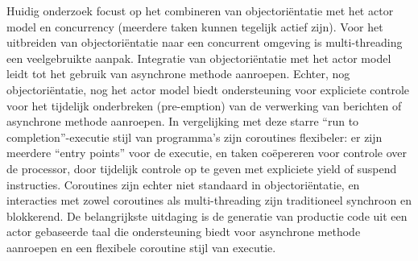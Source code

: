 Huidig onderzoek focust op het combineren van objectori\"{e}ntatie met het actor model en concurrency (meerdere taken kunnen tegelijk actief zijn).
Voor het uitbreiden van objectori\"{e}ntatie naar een concurrent omgeving is multi-threading een veelgebruikte aanpak.
Integratie van objectori\"{e}ntatie met het actor model leidt tot het gebruik van asynchrone methode aanroepen.
Echter, nog objectori\"{e}ntatie, nog het actor model biedt ondersteuning voor expliciete controle voor het tijdelijk onderbreken (pre-emption) van de verwerking van berichten of asynchrone methode aanroepen.
In vergelijking met deze starre ``run to completion''-executie stijl van programma's zijn coroutines flexibeler: er zijn meerdere ``entry points'' voor de executie, en taken co\"{e}pereren voor controle over de processor, door tijdelijk controle op te geven met expliciete yield of suspend instructies.
Coroutines zijn echter niet standaard in objectori\"{e}ntatie,
en interacties met zowel coroutines als multi-threading zijn traditioneel synchroon en blokkerend.
De belangrijkste uitdaging is de generatie van productie code uit een actor gebaseerde taal die ondersteuning biedt voor asynchrone methode aanroepen en een flexibele coroutine stijl van executie.

